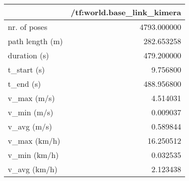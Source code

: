 \begin{tabular}{lr}
\toprule
{} &  /tf:world.base\_link\_kimera \\
\midrule
nr. of poses    &                 4793.000000 \\
path length (m) &                  282.653258 \\
duration (s)    &                  479.200000 \\
t\_start (s)     &                    9.756800 \\
t\_end (s)       &                  488.956800 \\
v\_max (m/s)     &                    4.514031 \\
v\_min (m/s)     &                    0.009037 \\
v\_avg (m/s)     &                    0.589844 \\
v\_max (km/h)    &                   16.250512 \\
v\_min (km/h)    &                    0.032535 \\
v\_avg (km/h)    &                    2.123438 \\
\bottomrule
\end{tabular}
